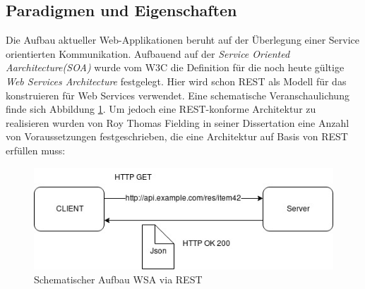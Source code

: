 \documentclass[fleqn,10.5pt,ngerman]{SelfArx}
\begin{document}
\subsection{Paradigmen und Eigenschaften}
Die Aufbau aktueller Web-Applikationen beruht auf der Überlegung einer Service orientierten Kommunikation. Aufbauend auf der \textit{Service Oriented Aarchitecture(SOA)} wurde vom W3C die Definition für die noch heute gültige \textit{Web Services Architecture} \cite{WSA} festgelegt. Hier wird schon REST als Modell für das konstruieren für Web Services verwendet. Eine schematische Veranschaulichung finde sich Abbildung \ref{fig:rest}. Um jedoch eine REST-konforme Architektur zu realisieren wurden von Roy Thomas Fielding in seiner Dissertation \cite{Fielding:2000} eine Anzahl von Voraussetzungen festgeschrieben, die eine Architektur auf Basis von REST erfüllen muss:
\begin{figure}[ht]\centering
	\includegraphics[width=8.5 cm]{Abbildungen/restcommunication.jpg}
	\caption{Schematischer Aufbau WSA via REST}
	\label{fig:rest}
\end{figure}
\end{document}
